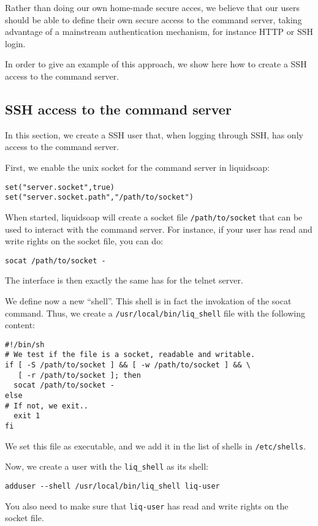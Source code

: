 Rather than doing our own home-made secure acces, we believe that our users should be 
able to define their own secure access to the command server, taking advantage of a 
mainstream authentication mechanism, for instance HTTP or SSH login.

In order to give an example of this approach, we show here how to create
a SSH access to the command server.

\subsection{SSH access to the command server}
In this section, we create a SSH user that, when logging through SSH, 
has only access to the command server. 

First, we enable the unix socket for the command server in liquidsoap:

\begin{verbatim}
set("server.socket",true) 
set("server.socket.path","/path/to/socket")
\end{verbatim}
When started, liquidsoap will create a socket file \verb+/path/to/socket+
that can be used to interact with the command server. For instance,
if your user has read and write rights on the socket file, you can do:

\begin{verbatim}
socat /path/to/socket -
\end{verbatim}
The interface is then exactly the same has for the telnet server.

We define now a new ``shell''. This shell is in fact the invokation of the 
socat command. Thus, we create a \verb+/usr/local/bin/liq_shell+ file with the following
content:

\begin{verbatim}
#!/bin/sh
# We test if the file is a socket, readable and writable.
if [ -S /path/to/socket ] && [ -w /path/to/socket ] && \
   [ -r /path/to/socket ]; then
  socat /path/to/socket -
else
# If not, we exit..
  exit 1
fi
\end{verbatim}
We set this file as executable, and we add it in the list of shells in \verb+/etc/shells+.

Now, we create a user with the \verb+liq_shell+ as its shell:

\begin{verbatim}
adduser --shell /usr/local/bin/liq_shell liq-user
\end{verbatim}
You also need to make sure that \verb+liq-user+ has read and write rights
on the socket file.

